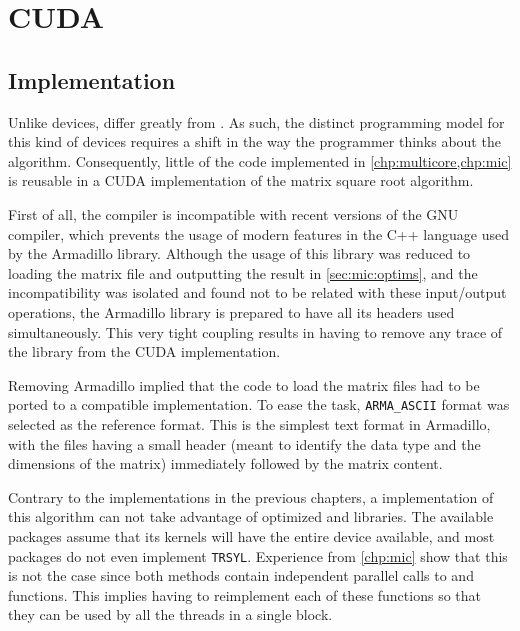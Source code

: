 \documentclass[../thesis]{subfiles}
\begin{document}
	\chapter{CUDA}
	\label{chp:cuda}

	
	

	\section{Implementation}
	Unlike \mic devices, \gpus differ greatly from \cpus. As such, the distinct programming model for this kind of devices requires a shift in the way the programmer thinks about the algorithm. Consequently, little of the code implemented in \cref{chp:multicore,chp:mic} is reusable in a CUDA implementation of the matrix square root algorithm.

	First of all, the \nvidia compiler is incompatible with recent versions of the GNU compiler, which prevents the usage of modern features in the C++ language used by the Armadillo library. Although the usage of this library was reduced to loading the matrix file and outputting the result in \cref{sec:mic:optims}, and the incompatibility was isolated and found not to be related with these input/output operations, the Armadillo library is prepared to have all its headers used simultaneously. This very tight coupling results in having to remove any trace of the library from the CUDA implementation.

	Removing Armadillo implied that the code to load the matrix files had to be ported to a compatible implementation. To ease the task, \texttt{ARMA\_ASCII} format was selected as the reference format. This is the simplest text format in Armadillo, with the files having a small header (meant to identify the data type and the dimensions of the matrix) immediately followed by the matrix content.

	Contrary to the implementations in the previous chapters, a \cuda implementation of this algorithm can not take advantage of optimized \blas and \lapack libraries. The available packages assume that its kernels will have the entire device available, and most \lapack packages do not even implement \texttt{TRSYL}. Experience from \cref{chp:mic} show that this is not the case since both methods contain independent parallel calls to \blas and \lapack functions. This implies having to reimplement each of these functions so that they can be used by all the threads in a single \cuda block.
\end{document}
